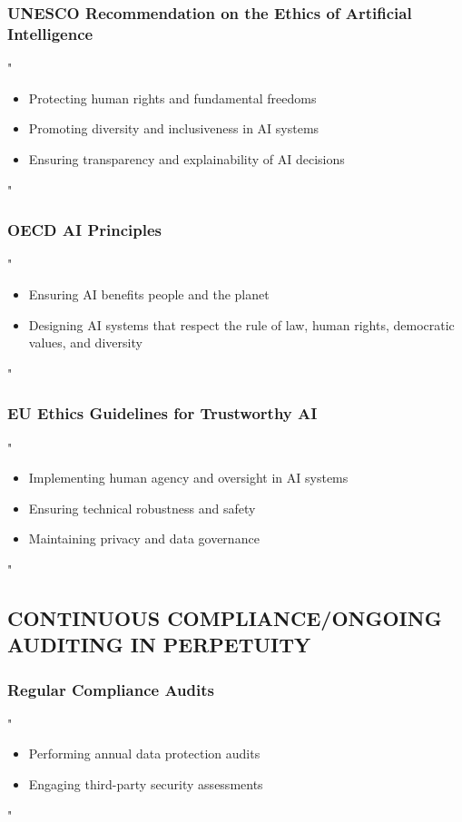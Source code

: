 \documentclass[14pt,a4paper]{article}
\begin{document}
\subsubsection*{UNESCO Recommendation on the Ethics of Artificial Intelligence}
"
\begin{itemize}
    \item Protecting human rights and fundamental freedoms
    \item Promoting diversity and inclusiveness in AI systems
    \item Ensuring transparency and explainability of AI decisions
\end{itemize}
"

\textit{\parencite{UNESCO2021}}

\subsubsection*{OECD AI Principles}
"
\begin{itemize}
    \item Ensuring AI benefits people and the planet
    \item Designing AI systems that respect the rule of law, human rights, democratic values, and diversity
\end{itemize}
"

\textit{\parencite{OECD2023}}

\subsubsection*{EU Ethics Guidelines for Trustworthy AI}
"
\begin{itemize}
    \item Implementing human agency and oversight in AI systems
    \item Ensuring technical robustness and safety
    \item Maintaining privacy and data governance
\end{itemize}
"

\textit{\parencite{EC2024}}

\subsection*{CONTINUOUS COMPLIANCE/ONGOING AUDITING IN PERPETUITY}

\subsubsection*{Regular Compliance Audits}
"
\begin{itemize}
    \item Performing annual data protection audits
    \item Engaging third-party security assessments
\end{itemize}
"
\end{document}
